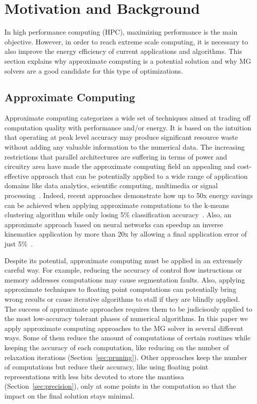 \section{Motivation and Background}
\label{sec:motivation}

In high performance computing (HPC), maximizing performance is the main
objective. However, in order to reach extreme scale computing, it is necessary
to also improve the energy efficiency of current applications and algorithms.
This section explains why approximate computing is a potential solution and why
MG solvers are a good candidate for this type of optimizations.

\subsection{Approximate Computing}
\label{sec:approx}


Approximate computing categorizes a wide set of techniques aimed at trading off computation quality with performance and/or energy.
It is based on the intuition that operating at peak level accuracy may produce significant resource waste without adding any valuable information to the numerical data.
The increasing restrictions that parallel architectures are suffering in terms of power and circuitry area have made the approximate computing field an appealing and cost-effective approach that can be potentially applied to a wide range of application domains like data analytics, scientific computing, multimedia or signal
processing~\cite{Mittal2016}.
Indeed, recent approaches demonstrate how up to 50x energy savings can be achieved when applying approximate computations to the k-means clustering algorithm while only losing 5\% classification accuracy~\cite{Chippa2013}.
Also, an approximate approach based on neural networks can speedup an inverse kinematics application by more than 20x by allowing a final application error of just 5\%~\cite{Grigorian2015}.

Despite its potential, approximate computing must be applied in an extremely careful way.
For example, reducing the accuracy of control flow instructions or memory addresses computations may cause segmentation faults.
Also, applying approximate techniques to floating point computations can potentially bring wrong results or cause iterative algorithms to stall if they are blindly applied.
The success of approximate approaches requires them to be judicisouly applied to the most low-accuracy tolerant phases of numerical algorithms.
In this paper we apply approximate computing approaches to the MG solver in several different ways.
Some of them reduce the amount of computations of certain routines while keeping the accuracy of each computation, like reducing on the number of relaxation iterations (Section~\ref{sec:pruning}).
Other approaches keep the number of computations but reduce their accuracy, like using floating point representations with less bits devoted to store the mantissa (Section~\ref{sec:precision}), only at some points in the computation so that
the impact on the final solution stays minimal.

